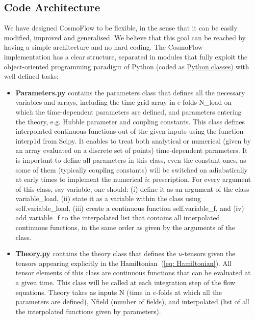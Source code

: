 \documentclass[11pt]{article}
\numberwithin{equation}{section} %
\begin{document}
\subsection{Code Architecture}

We have designed \textsf{CosmoFlow} to be flexible, in the sense that it can be easily modified, improved and generalised. We believe that this goal can be reached by having a simple architecture and no hard coding. The \textsf{CosmoFlow} implementation has a clear structure, separated in modules that fully exploit the object-oriented programming paradigm of Python (coded as \href{https://docs.python.org/3/tutorial/classes.html}{Python classes}) with well defined tasks:

\begin{itemize}
    \item \textbf{Parameters.py} contains the \textsf{parameters} class that defines all the necessary variables and arrays, including the time grid array in $e$-folds \textsf{N\_load} on which the time-dependent parameters are defined, and parameters entering the theory, e.g. Hubble parameter and coupling constants. This class defines interpolated continuous functions out of the given inputs using the function \textsf{interp1d} from \textsf{Scipy}. It enables to treat both analytical or numerical (given by an array evaluated on a discrete set of points) time-dependent parameters. It is important to define all parameters in this class, even the constant ones, as some of them (typically coupling constants) will be switched on adiabatically at early times to implement the numerical $i\epsilon$ prescription. For every argument of this class, say \textsf{variable}, one should: (i) define it as an argument of the class \textsf{variable\_load}, (ii) state it as a variable within the class using \textsf{self.variable\_load}, (iii) create a continuous function \textsf{self.variable\_f}, and (iv) add \textsf{variable\_f} to the \textsf{interpolated} list that contains all interpolated continuous functions, in the same order as given by the arguments of the class.
    
    \item \textbf{Theory.py} contains the \textsf{theory} class that defines the $u$-tensors given the tensors appearing explicitly in the Hamiltonian~(\ref{eq: Hamiltonian}). All tensor elements of this class are continuous functions that can be evaluated at a given time. This class will be called at each integration step of the flow equations. \textsf{Theory} takes as inputs \textsf{N} (time in $e$-folds at which all the parameters are defined), \textsf{Nfield} (number of fields), and \textsf{interpolated} (list of all the interpolated functions given by \textsf{parameters}). 


\end{itemize}
\end{document}

